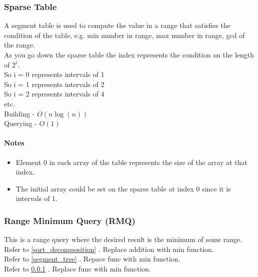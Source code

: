 \subsubsection{Sparse Table} \label{sparse_table}
A segment table is used to compute the value in a range that satisfies the condition of the table, e.g. min number in range, max number in range, gcd of the range. \\
As you go down the sparse table the index represents the condition on the length of $2^{i}$. \\
So i = 0 represents intervals of 1 \\
So i = 1 represents intervals of 2 \\
So i = 2 represents intervals of 4 \\
etc. \\
Building - $O(n\log(n))$ \\
Querying - $O(1)$

\paragraph{Notes}
\begin{itemize}
\item Element 0 in each array of the table represents the size of the array at that index.
\item The initial array could be set on the sparse table at index 0 since it is intervals of 1.
\end{itemize}

\subsubsection{Range Minimum Query (RMQ)} \label{rmq}
This is a range query where the desired result is the minimum of some range. \\
Refer to \ref{sqrt_decomposition} . Replace addition with min function. \\
Refer to \ref{segment_tree} . Repace func with min function. \\
Refer to \ref{sparse_table} . Replace func with min function. \\
